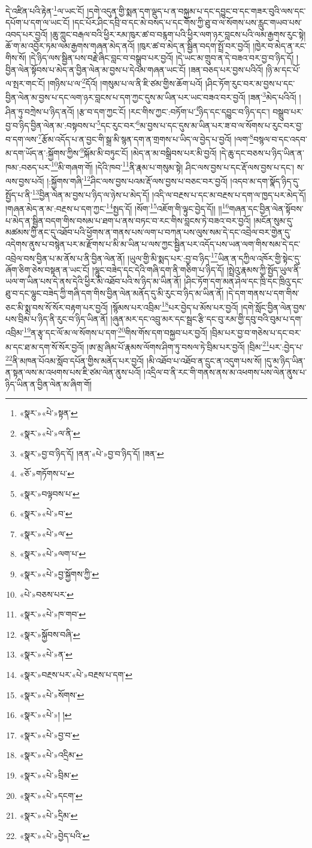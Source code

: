 དེ་འཛིན་པའི་རྟེན་\footnote{«སྣར་»«པེ་»སྟན་}ལ་ཡང་ངོ། །དགེ་འདུན་གྱི་སྨན་དག་ལྡུད་པ་ན་བསྐྱམ་པ་དང་དབྱུང་བ་དང་གཟར་བུའི་ལས་དང་དཔོག་པ་དག་ལ་ཡང་ངོ། །དང་པོར་ཤིང་དབྲི་བ་དང་མེ་བསད་པ་དང་གོས་ཀྱི་ཐུ་བ་ལ་སོགས་པས་རླུང་གཡབ་པས་འབད་པར་བྱའོ། །ཆུ་ཀླུང་བརྒལ་བའི་ཕྱིར་རམ་ཁུར་ཚ་བ་བརྙག་པའི་ཕྱིར་ལག་ཉར་བླངས་པའི་ལམ་རྒྱགས་རུང་སྟེ། ཆོ་ག་མ་འབྱོར་ཏམ་ལམ་རྒྱགས་གཞན་མེད་ནའོ། །ཁུར་ཚ་བ་མེད་ན་སྦྱིན་བདག་སྤྲོ་བར་བྱའོ། །ཁྱེར་བ་མེད་ན་རང་གིས་སོ། །དེ་ཉིད་ལས་སྦྱིན་པས་བརྗེ་ཞིང་བླང་བ་བསྒྲུབ་པར་བྱའོ། །དེ་ཡང་མ་གྲུབ་ན་དེ་བཟའ་བར་བྱ་བ་ཉིད་དོ། །བྱིན་ལེན་སྟོབས་པ་མེད་ན་བྱིན་ལེན་མ་བྱས་པ་དེའམ་གཞན་ཡང་ངོ། །ཟན་བཅད་པར་བྱས་པའིའོ། །ཉི་མ་དང་པོ་ལ་སྤར་གང་ངོ། །གཉིས་པ་ལ་\footnote{«སྣར་»«པེ་»ལ་ནི་}དོའོ། །གསུམ་པ་ལ་ནི་ཇི་ཙམ་གྱིས་ཆོག་པའོ། །ཤིང་ཏོག་རུང་བར་མ་བྱས་པ་དང་བྱིན་ལེན་མ་བྱས་པ་དང་ལག་ཉར་བླངས་པ་དག་ཀྱང་དུས་མ་ཡིན་པར་ཡང་བཟའ་བར་བྱའོ། །ཟན་\footnote{«སྣར་»བྱ་བ་ཉིད་དོ། །ནན་«པེ་»བྱ་བ་ཉིད་དོ། །ཟན་}མེད་པའིའོ། །ཤིན་ཏུ་བཀྲེས་པ་ཉིད་ནའོ། །རྩ་བ་དག་ཀྱང་ངོ། །རང་གིས་ཀྱང་:བཏོག་པ་\footnote{«ཅོ་»གཏོགས་པ་}ཉིད་དང་དབྱུང་བ་ཉིད་དང་། བསྒྲུབ་པར་བྱ་བ་ཉིད་བྱིན་ལེན་མ་:བསྟབས་པ་\footnote{«སྣར་»བལྟབས་པ་}དང་རུང་བར་\footnote{«སྣར་»«པེ་»བ་}མ་བྱས་པ་དང་དུས་མ་ཡིན་པར་ཟ་བ་ལ་སོགས་པ་རུང་བར་བྱ་བ་དག་ལས་\footnote{«སྣར་»«པེ་»ལ་}རྩོམ་འདོད་པ་ན་བྱང་གི་སྒྲ་མི་སྙན་དག་ན་གྲགས་པ་ཡིད་ལ་བྱེད་པ་བྱའོ། །ལག་\footnote{«སྣར་»«པེ་»ལག་པ་}བསྙལ་བ་དང་འདབ་མ་དག་ཡོད་ན་:སྐྱོགས་ཀྱིས་\footnote{«སྣར་»«པེ་»བྱ་སྐྱོགས་ཀྱི་}སྐོམ་མི་བཏུང་ངོ། །མེད་ན་མ་བསྒྲིབས་པར་མི་བྱའོ། །དེ་ཆུ་དང་བཅས་པ་ཉིད་ཡིན་ན་ཁམ་:བཅད་པར་\footnote{«པེ་»བཅས་པར་}མི་གཞག་གོ། །དེའི་ཁབ་\footnote{«སྣར་»«པེ་»ཁ་གབ་}ནི་རྣམ་པ་གསུམ་སྟེ། ཤིང་ལས་བྱས་པ་དང་རྡོ་ལས་བྱས་པ་དང་། ས་ལས་བྱས་པའོ། །:སྐྱོགས་གཞི་\footnote{«སྣར་»སྐྱོབས་བཞི་}ཤིང་ལས་བྱས་པའམ་རྡོ་ལས་བྱས་པ་བཅང་བར་བྱའོ། །འདབ་མ་དག་སྣོད་ཉིད་དུ་སྤྱོད་པ་ནི་\footnote{«སྣར་»«པེ་»ན་}བྱིན་ལེན་མ་བྱས་པ་ཉིད་ལ་ཉེས་པ་མེད་དོ། །འདི་ལ་བརྔས་པ་དང་མ་བརྔས་པ་དག་ལ་ཁྱད་པར་མེད་དོ། །གཞན་མེད་ན་མ་:བརྔས་པ་དག་ཀྱང་\footnote{«སྣར་»བརྔས་པར་«པེ་»བརྔས་པ་དག་}སྤྱད་དོ། །སོག་\footnote{«སྣར་»«པེ་»སོགས་}འཇོག་གི་ལྟུང་བྱེད་དོ།། །།\footnote{«སྣར་»«པེ་»། །}གཞན་དང་བྱིན་ལེན་སྟོབས་པ་མེད་ན་སྦྱིན་བདག་གིས་བསམ་པ་ཐག་པ་ནས་བཏང་བ་རང་གིས་བླངས་ཏེ་བཟའ་བར་བྱའོ། །མངོན་སུམ་དུ་མཚམས་ཀྱི་ནང་དུ་འཐོབ་པའི་ཕྱོགས་ན་གནས་པས་ལག་པ་བཀན་པས་ལུས་སམ་དེ་དང་འབྲེལ་བར་གྱེན་དུ་འདེགས་ནུས་པ་བསྙེན་པར་མ་རྫོགས་པ་མི་མ་ཡིན་པ་ལས་ཀྱང་སྦྱིན་པར་འདོད་པས་ཡན་ལག་གིས་སམ་དེ་དང་འབྲེལ་བས་བྱིན་པ་མ་ནོས་པ་ནི་བྱིན་ལེན་ནོ། །ཡུལ་གྱི་མི་སྨད་པར་:བྱ་བ་ཉིད་\footnote{«སྣར་»«པེ་»བྱ་བ་}ཡིན་ན་དཀྱིལ་འཁོར་གྱི་སྟེང་དུ་ཞོག་ཅིག་ཅེས་བསྟན་ན་ཡང་ངོ། །ལྷུང་བཟེད་དང་དེའི་གཞི་དག་ནི་གཅིག་པ་ཉིད་དོ། །སྤྲེའུ་རྣམས་ཀྱི་སྤྱོད་ཡུལ་ནི་ཡལ་ག་ཡིན་པས་དེ་ནས་དེའི་ཕྱིར་མི་འཐོབ་པའི་ས་ཉིད་མ་ཡིན་ནོ། །ཤིང་ཏོག་དག་མན་ཤེལ་དང་ཁྲི་དང་ཁྲིའུ་དང་ཐུ་བ་དང་ལྷུང་བཟེད་ཀྱི་གཞི་དག་གིས་བྱིན་ལེན་མནོད་དུ་མི་རུང་བ་ཉིད་མ་ཡིན་ནོ། །དེ་དག་གནས་པ་དག་གིས་ཅང་མི་སྨྲ་བས་སོ་སོར་བརྟག་པར་བྱའོ། །སྙོམས་པར་འབྲིམ་\footnote{«སྣར་»«པེ་»འདྲིམ་}པར་བྱེད་པ་མོས་པར་བྱའོ། །དགེ་སློང་བྱིན་ལེན་བྱས་པས་བྲིམ་པ་ཉིད་ནི་རུང་བ་ཉིད་ཡིན་ནོ། །ཞུན་མར་དང་འབྲུ་མར་དང་སྦྲང་རྩི་དང་བུ་རམ་གྱི་དབུ་བའི་བུམ་པ་དག་འབྲིམ་\footnote{«སྣར་»«པེ་»བྲིམ་}ན་རྩྭ་དང་ལོ་མ་ལ་སོགས་པ་དག་\footnote{«སྣར་»«པེ་»དངག་}གིས་གོས་དག་བསྐྱབ་པར་བྱའོ། །བྲིམ་པར་བྱ་བ་གཅེས་པ་དང་བར་མ་དང་ཐ་མ་དག་སོ་སོར་བྱའོ། །ཨ་མྲ་ཞིམ་པོ་རྣམས་ལོགས་ཤིག་ཏུ་བསལ་ཏེ་བྲིམ་པར་བྱའོ། །བྲིམ་\footnote{«སྣར་»«པེ་»དྲིམ་}པར་:བྱེད་པ་\footnote{«སྣར་»«པེ་»བྱེད་པའི་}ནི་མཁན་པོའམ་སློབ་དཔོན་གྱིས་མནོད་པར་བྱའོ། །མི་འཐོབ་པ་འཐོབ་ན་དྲུང་ན་འདུག་པས་སོ། །དུ་མ་ཉིད་ཡིན་ན་སྟན་ལས་མ་འཕགས་པས་ཇི་ཙམ་ལེན་ནུས་པའོ། །འདྲིལ་བ་ནི་རང་གི་གནས་ནས་མ་འཕགས་པས་ལེན་ནུས་པ་ཉིད་ཡིན་ན་བྱིན་ལེན་མ་ཞིག་གོ། 